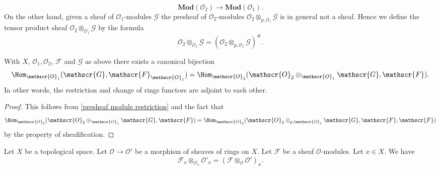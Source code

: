 \[\mathbf{Mod}(\mathscr{O}_2)\to\mathbf{Mod}(\mathscr{O}_1).\]
On the other hand, given a sheaf of $\mathscr{O}_1$-modules $\mathscr{G}$ the presheaf of $\mathscr{O}_2$-modules $\mathscr{O}_2\otimes_{p,\mathscr{O}_1}\mathscr{G}$ is in general not a sheaf. Hence we define the tensor product sheaf $\mathscr{O}_2\otimes_{\mathscr{O}_1}\mathscr{G}$ by the formula
\[\mathscr{O}_2\otimes_{\mathscr{O}_1}\mathscr{G}=(\mathscr{O}_2\otimes_{p,\mathscr{O}_1}\mathscr{G})^{\#}.\]
\begin{proposition}\label{sheaf module restrict adj}
With $X$, $\mathscr{O}_1,\mathscr{O}_2$, $\mathscr{F}$ and $\mathscr{G}$ as above there exists a canonical bijection
\[\Hom_{\mathscr{O}_1}(\mathscr{G},\mathscr{F}_{\mathscr{O}_1})=\Hom_{\mathscr{O}_2}(\mathscr{O}_2\otimes_{\mathscr{O}_1}\mathscr{G},\mathscr{F}).\]
In other words, the restriction and change of rings functors are adjoint to each other.
\end{proposition}
\begin{proof}
This follows from \cref{presheaf module restriction} and the fact that \[\Hom_{\mathscr{O}_2}(\mathscr{O}_2\otimes_{\mathscr{O}_1}\mathscr{G},\mathscr{F})=\Hom_{\mathscr{O}_2}(\mathscr{O}_2\otimes_{p,\mathscr{O}_1}\mathscr{G},\mathscr{F},\mathscr{F})\]
by the property of sheafification.
\end{proof}
\begin{proposition}\label{ext module stalk}
Let $X$ be a topological space. Let $\mathscr{O}\to\mathscr{O}'$ be a morphism of sheaves of rings on $X$. Let $\mathscr{F}$ be a sheaf $\mathscr{O}$-modules. Let $x\in X$. We have
\[\mathscr{F}_x\otimes_{\mathscr{O}_x}\mathscr{O}'_x=(\mathscr{F}\otimes_{\mathscr{O}}\mathscr{O}')_x.\]
\end{proposition}
